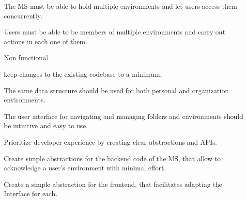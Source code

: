 \begin{myEnumerate}
\begin{myEnumerate}
\begin{myEnumerate}
        \end{myEnumerate}

      \item The MS must be able to hold multiple environments and let users access them concurrently.

      \item Users must be able to be members of multiple environments and carry out actions in each one of them.


    \end{myEnumerate}

  \item Non functional
    \begin{myEnumerate}
      \item keep changes to the existing codebase to a minimum.

      \item The same data structure should be used for both personal and organization environments.


      \item The user interface for navigating and managing folders and environments should
        be intuitive and easy to use.

      \item Prioritize developer experience by creating clear abstractions and APIs.
        \begin{myEnumerate}
          \item Create simple abstractions for the backend code of the MS, that allow to acknowledge a user's environment with minimal effort.
          \item Create a simple abstraction for the frontend, that facilitates adapting
            the Interface for each.
        \end{myEnumerate}

    \end{myEnumerate}

\end{myEnumerate}


